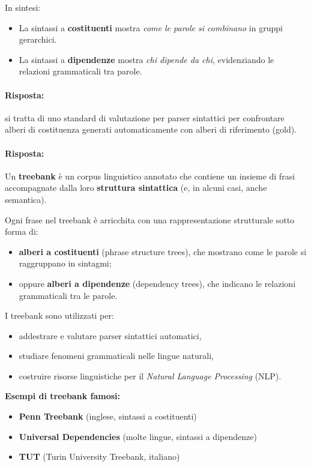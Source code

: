 \medskip
\noindent
In sintesi:
\begin{itemize}
    \item La sintassi a \textbf{costituenti} mostra \textit{come le parole si combinano} in gruppi gerarchici.
    \item La sintassi a \textbf{dipendenze} mostra \textit{chi dipende da chi}, evidenziando le relazioni grammaticali tra parole.
\end{itemize}


\paragraph{Risposta:} si tratta di uno standard di valutazione per parser sintattici per confrontare alberi di costituenza generati automaticamente con alberi di riferimento (gold).


\paragraph{Risposta:}
Un \textbf{treebank} è un corpus linguistico annotato che contiene un insieme di frasi accompagnate dalla loro \textbf{struttura sintattica} (e, in alcuni casi, anche semantica).

\medskip
Ogni frase nel treebank è arricchita con una rappresentazione strutturale sotto forma di:
\begin{itemize}
    \item \textbf{alberi a costituenti} (phrase structure trees), che mostrano come le parole si raggruppano in sintagmi;
    \item oppure \textbf{alberi a dipendenze} (dependency trees), che indicano le relazioni grammaticali tra le parole.
\end{itemize}

\medskip
I treebank sono utilizzati per:
\begin{itemize}
    \item addestrare e valutare parser sintattici automatici,
    \item studiare fenomeni grammaticali nelle lingue naturali,
    \item costruire risorse linguistiche per il \textit{Natural Language Processing} (NLP).
\end{itemize}

\medskip
\noindent
\textbf{Esempi di treebank famosi:}
\begin{itemize}
    \item \textbf{Penn Treebank} (inglese, sintassi a costituenti)
    \item \textbf{Universal Dependencies} (molte lingue, sintassi a dipendenze)
    \item \textbf{TUT} (Turin University Treebank, italiano)
\end{itemize}

